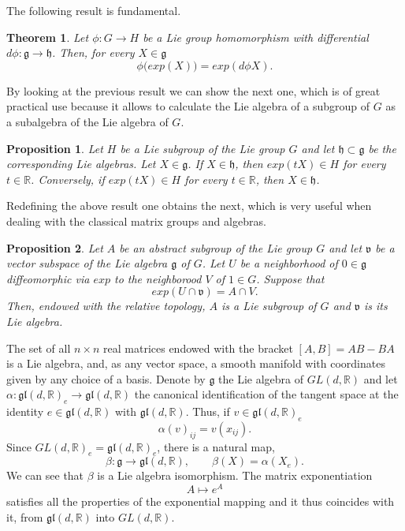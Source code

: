\documentclass[a4paper,11pt]{article} %
\numberwithin{equation}{section} %
\numberwithin{figure}{section} %
\newtheorem{thm}{Theorem}
\newtheorem{prop}{Proposition}
\begin{document}
The following result is fundamental.
\begin{thm} 
Let $\phi:G\rightarrow H$ be a Lie group homomorphism with differential $d\phi:\mathfrak{g}\rightarrow\mathfrak{h}$. Then, for every $X\in\mathfrak{g}$ 
\begin{equation}
\phi\big( exp (X) \big) = exp(d\phi X).
\end{equation}
\end{thm}

By looking at the previous result we can show the next one, which is of great practical use because it allows to calculate the Lie algebra of a subgroup of $G$ as a subalgebra of the Lie algebra of $G$.
\begin{prop} 
Let $H$ be a Lie subgroup of the Lie group $G$ and let $\mathfrak{h}\subset\mathfrak{g}$ be the corresponding Lie algebras. Let $X\in\mathfrak{g}$. If $X\in\mathfrak{h}$, then $exp(tX) \in H$ for every $t\in\mathbb{R}$. Conversely, if $exp(tX) \in H$ for every  $t\in \mathbb{R}$, then $X\in\mathfrak{h}$.
\end{prop}

Redefining the above result one obtains the next, which is very useful when dealing with the classical matrix groups and algebras. 
\begin{prop}
Let $A$ be an abstract subgroup of the Lie group $G$ and let $\mathfrak{v}$ be a vector subspace of the Lie algebra $\mathfrak{g}$ of $G$. Let $U$ be a neighborhood of $0\in\mathfrak{g}$ diffeomorphic via $exp$ to the neighborood $V$ of $1 \in G$. Suppose that
\begin{equation}
 exp (U\cap\mathfrak{v})=A\cap V.
\end{equation}
Then, endowed with the relative topology, $A$ is a Lie subgroup of $G$ and $\mathfrak{v}$ is its Lie algebra.
\end{prop}

The set  of all $n\times n$ real matrices endowed with the bracket $[A,B]=AB-BA$ is a Lie algebra, and, as any vector space, a smooth manifold with coordinates given by any choice of a basis. Denote by $\mathfrak{g}$ the Lie algebra of $GL(d,\mathbb{R})$ and let $\alpha:\mathfrak{gl}(d,\mathbb{R})_e\rightarrow \mathfrak{gl}(d,\mathbb{R})$ the canonical identification of the tangent space at the identity $e\in\mathfrak{gl}(d,\mathbb{R})$ with $\mathfrak{gl}(d,\mathbb{R})$. Thus, if  $v\in\mathfrak{gl}(d,\mathbb{R})_e$ 
\begin{equation}
\alpha(v)_{ij}=v(x_{ij}).
\end{equation}
Since $GL(d,\mathbb{R})_e=\mathfrak{gl}(d,\mathbb{R})_e$, there is a natural map,
\begin{equation}
\beta:\mathfrak{g}\rightarrow\mathfrak{gl}(d,\mathbb{R}),\qquad\beta(X)=\alpha(X_e). 
\end{equation}
We can see that $\beta$ is a Lie algebra isomorphism. The matrix exponentiation
\begin{equation}
 A\mapsto e^A \label{MatrixExpo}
\end{equation}
satisfies all the properties of the exponential mapping and it thus coincides with it, from $\mathfrak{gl}(d,\mathbb{R})$ into $GL(d,\mathbb{R})$.
\end{document}
